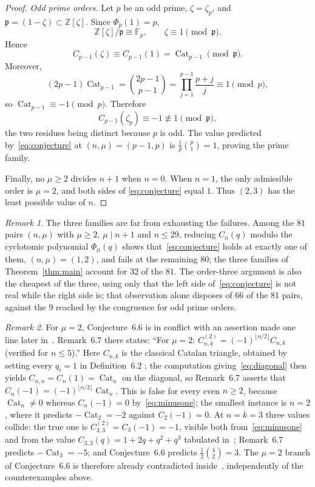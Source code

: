 \documentclass[11pt]{amsart}
\theoremstyle{remark}
\newtheorem*{remark}{Remark}
\newcommand{\Cat}{\operatorname{Cat}}
\begin{document}
\begin{proof}
\medskip
\noindent\emph{Odd prime orders.}
Let $p$ be an odd prime, $\zeta=\zeta_p$, and
$\mathfrak p=(1-\zeta)\subset\mathbb Z[\zeta]$. Since
$\Phi_p(1)=p$,
\[
  \mathbb Z[\zeta]/\mathfrak p\cong\mathbb F_p,
  \qquad \zeta\equiv1\pmod{\mathfrak p}.
\]
Hence
\[
  C_{p-1}(\zeta)
  \equiv C_{p-1}(1)
  =\Cat_{p-1}\pmod{\mathfrak p}.
\]
Moreover,
\[
  (2p-1)\Cat_{p-1}
  =\binom{2p-1}{p-1}
  =\prod_{j=1}^{p-1}\frac{p+j}{j}
  \equiv1\pmod p,
\]
so $\Cat_{p-1}\equiv-1\pmod p$. Therefore
\[
  C_{p-1}(\zeta_p)\equiv-1\not\equiv1\pmod{\mathfrak p},
\]
the two residues being distinct because $p$ is odd. The value
predicted by~\eqref{eq:conjecture} at $(n,\mu)=(p-1,p)$
is $\frac1p\binom p1=1$, proving the prime family.

Finally, no $\mu\ge2$ divides $n+1$ when $n=0$. When $n=1$, the
only admissible order is $\mu=2$, and both sides of
\eqref{eq:conjecture} equal $1$. Thus $(2,3)$ has the least possible
value of $n$.
\end{proof}

\begin{remark}
The three families are far from exhausting the failures. Among the
$81$ pairs $(n,\mu)$ with $\mu\ge2$, $\mu\mid n+1$ and $n\le29$,
reducing $C_n(q)$ modulo the cyclotomic polynomial $\Phi_\mu(q)$
shows that~\eqref{eq:conjecture} holds at exactly one of them,
$(n,\mu)=(1,2)$, and fails at the remaining $80$; the three families
of Theorem~\ref{thm:main} account for $32$ of the $81$. The
order-three argument is also the cheapest of the three, using only
that the left side of~\eqref{eq:conjecture} is not real while the
right side is; that observation alone disposes of $66$ of the $81$
pairs, against the $9$ reached by the congruence for odd prime orders.
\end{remark}

\begin{remark}
For $\mu=2$, Conjecture~6.6 is in conflict with an assertion made one
line later in~\cite{Wirdane}. Remark~6.7 there states: ``For $\mu=2$:
$C_{n,k}^{(2)}=(-1)^{\lfloor n/2\rfloor}C_{n,k}$ (verified for
$n\le5$).'' Here $C_{n,k}$ is the classical Catalan triangle, obtained
by setting every $q_i=1$ in Definition~6.2
\cite[Corollary~6.5]{Wirdane}; the computation
giving~\eqref{eq:diagonal} then yields $C_{n,n}=C_n(1)=\Cat_n$ on the
diagonal, so Remark~6.7 asserts that
$C_n(-1)=(-1)^{\lfloor n/2\rfloor}\Cat_n$. This is false for every
even $n\ge2$, because $\Cat_n\ne0$ whereas $C_n(-1)=0$
by~\eqref{eq:minusone}; the smallest instance is $n=2$, where it
predicts $-\Cat_2=-2$ against $C_2(-1)=0$. At $n=k=3$ three values
collide: the true one is $C_{3,3}^{(2)}=C_3(-1)=-1$, visible both
from~\eqref{eq:minusone} and from the value
$C_{3,3}(q)=1+2q+q^2+q^3$ tabulated in~\cite{Wirdane}; Remark~6.7
predicts $-\Cat_3=-5$; and Conjecture~6.6 predicts
$\frac12\binom42=3$. The $\mu=2$ branch of Conjecture~6.6 is
therefore already contradicted inside~\cite{Wirdane}, independently of
the counterexamples above.
\end{remark}
\end{document}
